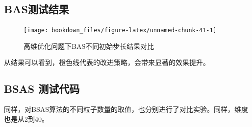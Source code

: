 \documentclass[]{ctexbook}
\begin{document}
\subsection{BAS测试结果}\label{bas}

\begin{figure}

{\centering \texttt{[image: bookdown\_files/figure-latex/unnamed-chunk-41-1]} 

}

\caption{高维优化问题下BAS不同初始步长结果对比}\label{fig:unnamed-chunk-41}
\end{figure}

从结果可以看到，橙色线代表的改进策略，会带来显著的效果提升。

\subsection{BSAS 测试代码}\label{bsas-}

同样，对BSAS算法的不同粒子数量的取值，也分别进行了对比实验。同样，维度也是从2到40。
\end{document}
